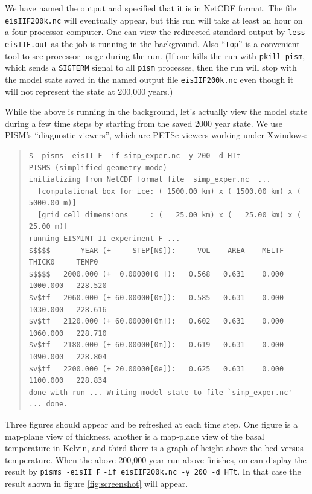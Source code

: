 \documentclass[11pt,final]{amsart}
\renewcommand{\t}[1]{\texttt{#1}}
\begin{document}
\noindent We have named the output and specified that it is in NetCDF format.  The file \verb|eisIIF200k.nc| will eventually appear, but this run will take at least an hour on a four processor computer.  One can view the redirected standard output by \verb|less eisIIF.out| as the job is running in the background.  Also ``\t{top}'' is a convenient tool to see processor usage during the run.  (If one kills the run with \verb|pkill pism|, which sends a \verb|SIGTERM| signal to all \verb|pism| processes, then the run will stop with the model state saved in the named output file \verb|eisIIF200k.nc| even though it will not represent the state at 200,000 years.)

While the above is running in the background, let's actually view the model state during a few time steps by starting from the saved 2000 year state.  We use PISM's ``diagnostic viewers'', which are PETSc viewers working under Xwindows:

\small\begin{quote}\begin{verbatim}
$  pisms -eisII F -if simp_exper.nc -y 200 -d HTt
PISMS (simplified geometry mode)
initializing from NetCDF format file  simp_exper.nc  ...
  [computational box for ice: ( 1500.00 km) x ( 1500.00 km) x ( 5000.00 m)]
  [grid cell dimensions     : (   25.00 km) x (   25.00 km) x (   25.00 m)]
running EISMINT II experiment F ...
$$$$$       YEAR (+     STEP[N$]):     VOL    AREA    MELTF     THICK0     TEMP0
$$$$$   2000.000 (+  0.00000[0 ]):   0.568   0.631    0.000   1000.000   228.520
$v$tf   2060.000 (+ 60.00000[0m]):   0.585   0.631    0.000   1030.000   228.616
$v$tf   2120.000 (+ 60.00000[0m]):   0.602   0.631    0.000   1060.000   228.710
$v$tf   2180.000 (+ 60.00000[0m]):   0.619   0.631    0.000   1090.000   228.804
$v$tf   2200.000 (+ 20.00000[0e]):   0.625   0.631    0.000   1100.000   228.834
done with run ... Writing model state to file `simp_exper.nc' ... done.
\end{verbatim}
\end{quote}\normalsize

Three figures should appear and be refreshed at each time step.  One figure is a map-plane view of thickness, another is a map-plane view of the basal temperature in Kelvin, and third there is a graph of height above the bed versus temperature.  When the above 200,000 year run above finishes, on can display the result by \verb|pisms -eisII F| \verb|-if eisIIF200k.nc -y 200 -d HTt|.  In that case the result shown in figure \ref{fig:screenshot} will appear.
\medskip
\end{document}
